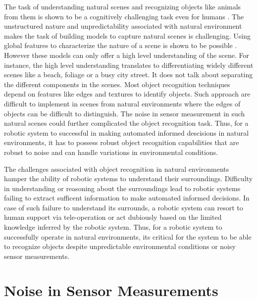 \documentclass {udthesis}
\begin{document}
The task of understanding natural scenes and recognizing objects like animals from them is shown to be a cognitively challenging task 
even for humans \cite{wichmann}. The unstructured nature and unpredictability associated with natural environment makes the task of 
building models to capture natural scenes is challenging.
Using global features to characterize the nature of a scene is shown to be possible \cite{olivia}. However these models can only offer a high level understanding
of the scene. For instance, the high level understanding translates to differentiating widely different scenes like a beach, foliage or a busy city street. It does not talk about separating the different components in the scenes. Most object recognition techniques depend on features like edges and textures to identify objects. Such approach are difficult to implement in scenes from natural environments where the edges of objects can be difficult to distinguish.
The noise in sensor measurement in such natural scenes could further complicated the object recognition task. Thus, for a robotic system to 
successful in making automated informed descisions in natural environments, it has to possess robust object recognition capabilities
that are robust to noise and can handle variations in environmental conditions.

The challenges associated with object recognition in natural environments hamper the ability of robotic systems to understand their surroundings.
Difficulty in understanding or reasoning about the surroundings lead to robotic systems failing to extract sufficent information to make automated 
informed decisions. In case of such failure to understand its surrounds, a robotic system can resort to human support via tele-operation or 
act dubiously based on the limited knowledge inferred by the robotic system. Thus, for a robotic system to successfully operate in natural environments, its critical for the system to be able to recognize objects despite unpredictable environmental conditions or noisy sensor measurements.

\section{Noise in Sensor Measurements}
\end{document}

